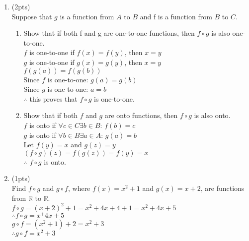 \documentclass[12pt]{article}
\begin{document}
\begin{enumerate}
\item  (2pts) \\
Suppose that $g$ is a function from $A$ to $B$ and f is a function
from $B$ to $C$.
\begin{enumerate}
	\item Show that if both f and g are one-to-one functions,
	then $f \circ g$ is also one-to-one.
    \\$f$ is one-to-one if $f(x) = f(y)$, then $x = y$
    \\$g$ is one-to-one if $g(x) = g(y)$, then $x = y$
    \\$f(g(a)) = f(g(b))$
    \\Since $f$ is one-to-one: $g(a) = g(b)$
    \\Since $g$ is one-to-one: $a = b$
    \\$\therefore$ this proves that $f \circ g$ is one-to-one.
	\item Show that if both $f$ and $g$ are onto functions, then $f \circ g$
	is also onto.
    \\$f$ is onto if $\forall c \in C \exists b \in B$: $f(b) = c$
    \\$g$ is onto if $\forall b \in B \exists a \in A$: $g(a) = b$
    \\Let $f(y) = x $ and $g(z) = y$
    \\$(f \circ g)(z) = f(g(z)) = f(y) = x$
    \\$\therefore$ $f \circ g$ is onto.
\end{enumerate}

\item  (1pts) \\
Find  $f \circ g$  and  $g \circ f$, where $f(x) = x^2 + 1$ and $g(x) = x + 2$,
are functions from $\mathbb{R}$ to $\mathbb{R}$.
\\$f \circ g = (x + 2)^2 + 1 = x^2 + 4x + 4 + 1 = x^2 + 4x + 5$
\\$\therefore f \circ g = x^ + 4x + 5$
\\$g \circ f = (x^2 + 1) + 2 = x^2 + 3$
\\$\therefore g \circ f = x^2 + 3$


\end{enumerate}
\end{document}
